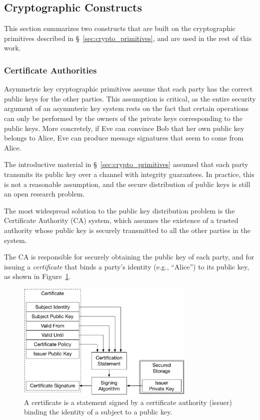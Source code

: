 \subsection{Cryptographic Constructs}
\label{sec:crypto_constructs}

This section summarizes two constructs that are built on the cryptographic
primitives described in \S~\ref{sec:crypto_primitives}, and are used in the
rest of this work.


\subsubsection{Certificate Authorities}
\label{sec:certificates}

Asymmetric key cryptographic primitives assume that each party has the correct
public keys for the other parties. This assumption is critical, as the entire
security argument of an asymmteric key system rests on the fact that certain
operations can only be performed by the owners of the private keys
corresponding to the public keys. More concretely, if Eve can convince Bob
that her own public key belongs to Alice, Eve can produce message signatures
that seem to come from Alice.

The introductive material in \S~\ref{sec:crypto_primitives} assumed that each
party transmits its public key over a channel with integrity guarantees. In
practice, this is not a reasonable assumption, and the secure distribution of
public keys is still an open research problem.

The most widespread solution to the public key distribution problem is the
Certificate Authority (CA) system, which assumes the existence of a trusted
authority whose public key is securely transmitted to all the other parties in
the system.

The CA is responsible for securely obtaining the public key of each party, and
for issuing a \textit{certificate} that binds a party's identity (e.g.,
``Alice'') to its public key, as shown in Figure~\ref{fig:certificate}.

\begin{figure}[hbt]
  \centering
  \includegraphics[width=85mm]{figures/certificate.pdf}
  \caption{
    A certificate is a statement signed by a certificate authority (issuer)
    binding the identity of a subject to a public key.
  }
  \label{fig:certificate}
\end{figure}

